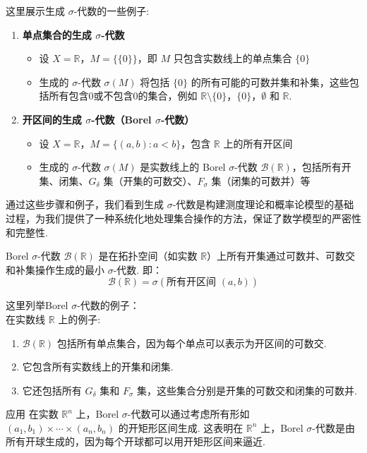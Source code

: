 \documentclass[UTF8,12pt,AutoFakeBold]{ctexart}
\numberwithin{equation}{section}%
\begin{document}
	
	\begin{example}这里展示生成 $\sigma$-代数的一些例子:
		\begin{enumerate}
			\item \textbf{单点集合的生成 $\sigma$-代数}
			\begin{itemize}
				\item 设 $X = \mathbb{R}$，$M = \{ \{0\} \}$，即 $M$ 只包含实数线上的单点集合 $\{0\}$
				\item 生成的 $\sigma$-代数 $\sigma(M)$ 将包括 $\{0\}$ 的所有可能的可数并集和补集，这些包括所有包含0或不包含0的集合，例如 $\mathbb{R} \setminus \{0\}$，$\{0\}$，$\emptyset$ 和 $\mathbb{R}$.
			\end{itemize}
			\item \textbf{开区间的生成 $\sigma$-代数（Borel $\sigma$-代数）}
			\begin{itemize}
				\item 设 $X = \mathbb{R}$，$M = \{(a, b) : a < b\}$，包含 $\mathbb{R}$ 上的所有开区间
				\item 生成的 $\sigma$-代数 $\sigma(M)$ 是实数线上的 Borel $\sigma$-代数 $\mathcal{B}(\mathbb{R})$，包括所有开集、闭集、$G_\delta$ 集（开集的可数交）、$F_\sigma$ 集（闭集的可数并）等
			\end{itemize}
		\end{enumerate}
		通过这些步骤和例子，我们看到生成 $\sigma$-代数是构建测度理论和概率论模型的基础过程，为我们提供了一种系统化地处理集合操作的方法，保证了数学模型的严密性和完整性.
	\end{example}
	
	\begin{definition}
		Borel $\sigma$-代数 $\mathcal{B}(\mathbb{R})$ 是在拓扑空间（如实数 $\mathbb{R}$）上所有开集通过可数并、可数交和补集操作生成的最小 $\sigma$-代数. 即：
		\[
		\mathcal{B}(\mathbb{R}) = \sigma(\text{所有开区间 } (a, b))
		\]
	\end{definition}


	\begin{example}这里列举Borel $\sigma$-代数的例子：\\
		在实数线 $\mathbb{R}$ 上的例子:
		\begin{enumerate}
			\item $\mathcal{B}(\mathbb{R})$ 包括所有单点集合，因为每个单点可以表示为开区间的可数交.
			\item 它包含所有实数线上的开集和闭集.
			\item 它还包括所有 $G_\delta$ 集和 $F_\sigma$ 集，这些集合分别是开集的可数交和闭集的可数并.
		\end{enumerate}
		
	\end{example}

	\begin{ascolorbox8}{应用}
		在实数 $\mathbb{R}^n$ 上，Borel $\sigma$-代数可以通过考虑所有形如 $(a_1, b_1) \times \cdots \times (a_n, b_n)$ 的开矩形区间生成. 这表明在 $\mathbb{R}^n$ 上，Borel $\sigma$-代数是由所有开球生成的，因为每个开球都可以用开矩形区间来逼近.
	\end{ascolorbox8}

	
	
	
	
	
	
	\newpage
		

	
\end{document}
